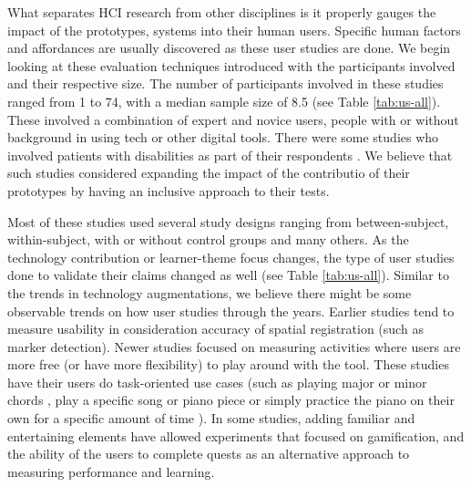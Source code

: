 \documentclass[sigconf, screen, review]{acmart}
\begin{document}
What separates HCI research from other disciplines is it properly gauges the impact of the prototypes, systems into their human users. Specific human factors and affordances are usually discovered as these user studies are done. We begin looking at these evaluation techniques introduced with the participants involved and their respective size. The number of participants involved in these studies ranged from 1 to 74, with a median sample size of 8.5 (see Table \ref{tab:us-all}). These involved a combination of expert and novice users, people with or without background in using tech or other digital tools. There were some studies who involved patients with disabilities as part of their respondents \cite{correa2009computer, chouvatut2013virtual}. We believe that such studies considered expanding the impact of the contributio of their prototypes by having an inclusive approach to their tests. 

Most of these studies used several study designs ranging from between-subject, within-subject, with or without control groups and many others. As the technology contribution or learner-theme focus changes, the type of user studies done to validate their claims changed as well (see Table \ref{tab:us-all}). Similar to the trends in technology augmentations, we believe there might be some observable trends on how user studies through the years. Earlier studies tend to measure usability in consideration accuracy of spatial registration (such as marker detection). Newer studies focused on measuring activities where users are more free (or have more flexibility) to play around with the tool. These studies have their users do task-oriented use cases (such as playing major or minor chords \cite{nugraha2014pemanfaatan, xiao2010mirrorfugue}, play a specific song or piano piece \cite{chow2013music, sandnes2019enhanced,pan2018pilot} or simply practice the piano on their own for a specific amount of time \cite{weing2013piano, raymaekers2014game}). In some studies, adding familiar and entertaining elements have allowed experiments that focused on gamification, and the ability of the users to complete quests as an alternative approach to measuring performance and learning. 
\end{document}
